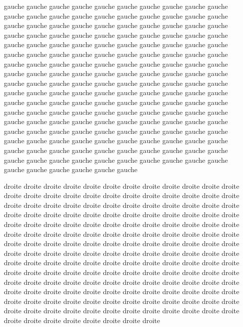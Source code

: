 \documentclass[openany]{book}
\begin{document}
\Pages

\begin{pages}

\begin{Leftside}
  \beginnumbering



\pstart
gauche gauche gauche gauche gauche gauche gauche gauche gauche gauche
gauche gauche gauche gauche gauche gauche gauche gauche gauche gauche
gauche gauche gauche gauche gauche gauche gauche gauche gauche gauche
gauche gauche gauche gauche gauche gauche gauche gauche gauche gauche
gauche gauche gauche gauche gauche gauche gauche gauche gauche gauche
gauche gauche gauche gauche gauche gauche gauche gauche gauche gauche
gauche gauche gauche gauche gauche gauche gauche gauche gauche gauche
gauche gauche gauche gauche gauche gauche gauche gauche gauche gauche
gauche gauche gauche gauche gauche gauche gauche gauche gauche gauche
gauche gauche gauche gauche gauche gauche gauche gauche gauche gauche
gauche gauche gauche gauche gauche gauche gauche gauche gauche gauche
gauche gauche gauche gauche gauche gauche gauche gauche gauche gauche
gauche gauche gauche gauche gauche gauche gauche gauche gauche gauche
gauche gauche gauche gauche gauche gauche gauche gauche gauche gauche
gauche gauche gauche gauche gauche gauche gauche gauche gauche gauche
gauche gauche gauche gauche gauche gauche gauche gauche gauche gauche
gauche gauche gauche gauche gauche gauche gauche gauche gauche gauche
gauche gauche gauche gauche gauche gauche
\pend

  \endnumbering
\end{Leftside}

\begin{Rightside}
\beginnumbering



\pstart
droite droite droite droite droite droite droite droite droite droite
droite droite droite droite droite droite droite droite droite droite
droite droite droite droite droite droite droite droite droite droite
droite droite droite droite droite droite droite droite droite droite
droite droite droite droite droite droite droite droite droite droite
droite droite droite droite droite droite droite droite droite droite
droite droite droite droite droite droite droite droite droite droite
droite droite droite droite droite droite droite droite droite droite
droite droite droite droite droite droite droite droite droite droite
droite droite droite droite droite droite droite droite droite droite
droite droite droite droite droite droite droite droite droite droite
droite droite droite droite droite droite droite droite droite droite
droite droite droite droite droite droite droite droite droite droite
droite droite droite droite droite droite droite droite droite droite
droite droite droite droite droite droite droite droite droite droite
droite droite droite droite droite droite droite droite droite droite
droite droite droite droite droite droite droite droite droite droite
droite droite droite droite droite droite
\pend

\endnumbering  
\end{Rightside}

\end{pages}

\Pages
\end{document}
